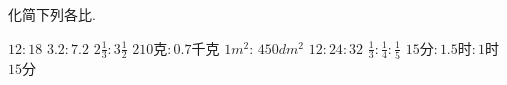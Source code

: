 化简下列各比.
\begin{subquestions}
    \subquestion$12: 18$   
    \subquestion$3.2: 7.2$
    \subquestion$2\frac{1}{3}: 3\frac{1}{2}$
    \subquestion$210$克$:0.7$千克
    \subquestion$1{m^2}$: $450{dm^2}$
    \subquestion$12:24:32$
    \subquestion$\frac{1}{3}:\frac{1}{4}:\frac{1}{5}$ \subquestion$15$分$:1.5$时$:1$时$15$分
\end{subquestions}